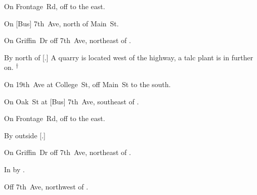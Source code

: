 

\begin{LocationList}

On Frontage~Rd, off   to the east.

On [Bus] 7th~Ave, north of  Main~St.

On Griffin~Dr off 7th~Ave, northeast of  .

By  north of [.]
A quarry is located west of the highway, a talc plant is in  further on.%
\textsuperscript{\scriptsize $\dagger$}

On 19th~Ave at College~St, off  Main~St to the south.

On Oak~St at [Bus] 7th~Ave, southeast of  .

On Frontage~Rd, off   to the east.

By  outside [.]

\Location{\TruckService \Service}
On Griffin~Dr off 7th~Ave, northeast of  .

\Location{\TruckStop \Gas \Rest}
In  by .

Off 7th~Ave, northwest of  .

\end{LocationList}

